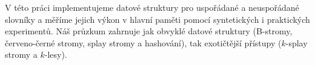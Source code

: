 \documentclass[12pt,a4paper,twoside,openright]{report}
\begin{document}
V této práci implementujeme datové struktury pro uspořádané a neuspořádané
slovníky a měříme jejich výkon v hlavní paměti pomocí syntetických i
praktických experimentů. Náš průzkum zahrnuje jak obvyklé datové struktury
(B-stromy, červeno-černé stromy, splay stromy a hashování), tak exotičtější
přístupy ($k$-splay stromy a $k$-lesy).
\end{document}
